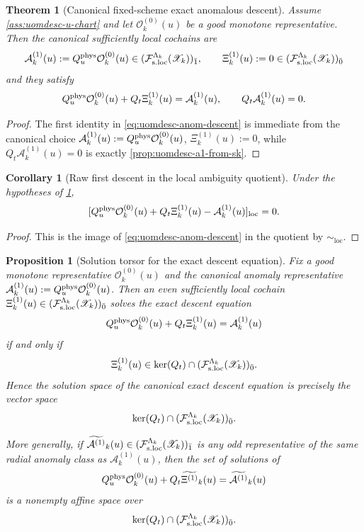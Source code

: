 \documentclass[11pt]{article}
\theoremstyle{definition}
\theoremstyle{plain}
\newtheorem{theorem}[definition]{Theorem}
\newtheorem{proposition}[definition]{Proposition}
\newtheorem{corollary}[definition]{Corollary}
\theoremstyle{remark}
\newcommand{\Fsloc}{\mathcal F_{\rm s.loc}}
\newcommand{\Xscr}{\mathscr X}
\newcommand{\Ozero}{\mathcal O^{(0)}}
\newcommand{\Aone}{\mathcal A^{(1)}}
\newcommand{\Xione}{\Xi^{(1)}}
\newcommand{\Qt}{Q_t}
\newcommand{\Quphys}{Q_u^{\rm phys}}
\newcommand{\loc}{\mathrm{loc}}
\begin{document}
\begin{theorem}[Canonical fixed-scheme exact anomalous descent]
\label{thm:uomdesc-raw}
Assume \cref{ass:uomdesc-u-chart} and let \(\Ozero_k(u)\) be a good monotone representative.
Then the canonical sufficiently local cochains are
\[
\Aone_k(u):=\Quphys\Ozero_k(u)\in(\Fsloc^{\Lambda_k}(\Xscr_k))_{\bar 1},
\qquad
\Xione_k(u):=0\in(\Fsloc^{\Lambda_k}(\Xscr_k))_{\bar 0}
\]
and they satisfy
\begin{equation}
\Quphys\Ozero_k(u)+\Qt\Xione_k(u)=\Aone_k(u),
\qquad
\Qt \Aone_k(u)=0.
\label{eq:uomdesc-anom-descent}
\end{equation}
\end{theorem}

\begin{proof}
The first identity in \eqref{eq:uomdesc-anom-descent} is immediate from the canonical choice
\(\Aone_k(u):=\Quphys\Ozero_k(u)\), \(\Xione_k(u):=0\), while
\(\Qt\Aone_k(u)=0\) is exactly \cref{prop:uomdesc-a1-from-sk}.
\end{proof}

\begin{corollary}[Raw first descent in the local ambiguity quotient]
\label{cor:uomdesc-anom-descent-loc}
Under the hypotheses of \cref{thm:uomdesc-raw},
\[
[\Quphys\Ozero_k(u)+\Qt\Xione_k(u)-\Aone_k(u)]_{\loc}=0.
\]
\end{corollary}

\begin{proof}
This is the image of \eqref{eq:uomdesc-anom-descent} in the quotient by \(\sim_{\loc}\).
\end{proof}

\begin{proposition}[Solution torsor for the exact descent equation]
\label{prop:uomdesc-solution-torsor}
Fix a good monotone representative \(\Ozero_k(u)\) and the canonical anomaly representative
\(\Aone_k(u):=\Quphys\Ozero_k(u)\).
Then an even sufficiently local cochain \(\Xione_k(u)\in(\Fsloc^{\Lambda_k}(\Xscr_k))_{\bar 0}\)
solves the exact descent equation
\[
\Quphys\Ozero_k(u)+\Qt\Xione_k(u)=\Aone_k(u)
\]
if and only if
\[
\Xione_k(u)\in \ker(\Qt)\cap(\Fsloc^{\Lambda_k}(\Xscr_k))_{\bar 0}.
\]
Hence the solution space of the canonical exact descent equation is precisely the vector space
\[
\ker(\Qt)\cap(\Fsloc^{\Lambda_k}(\Xscr_k))_{\bar 0}.
\]

More generally, if
\(\widetilde{\Aone}_k(u)\in(\Fsloc^{\Lambda_k}(\Xscr_k))_{\bar 1}\) is any odd representative of the
same radial anomaly class as \(\Aone_k(u)\), then the set of solutions of
\[
\Quphys\Ozero_k(u)+\Qt\widetilde{\Xione}_k(u)=\widetilde{\Aone}_k(u)
\]
is a nonempty affine space over
\[
\ker(\Qt)\cap(\Fsloc^{\Lambda_k}(\Xscr_k))_{\bar 0}.
\]
\end{proposition}
\end{document}
